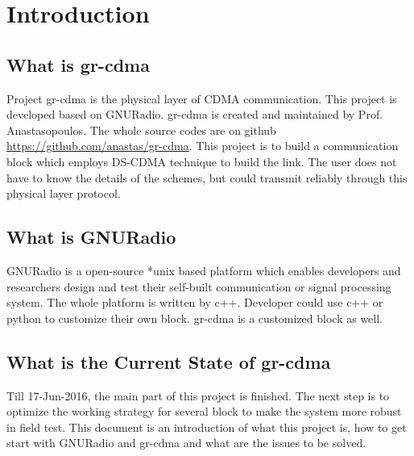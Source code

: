 \chapter{Introduction}
\section{What is gr-cdma}
Project gr-cdma is the physical layer of CDMA communication. This project is developed based on GNURadio\cite{GNURadio}.
gr-cdma is created and maintained by Prof. Anastasopoulos.
The whole source codes are on github \url{https://github.com/anastas/gr-cdma}.
This project is to build a communication block which employs DS-CDMA technique to build the link.
The user does not have to know the details of the schemes, but could transmit reliably through this physical layer protocol.

\section{What is GNURadio}
GNURadio\cite{GNURadio} is a open-source *unix based platform which enables developers and researchers design and test their self-built communication or signal processing system.
The whole platform is written by c++. Developer could use c++ or python to customize their own block. gr-cdma is a customized block as well.

\section{What is the Current State of gr-cdma}
Till 17-Jun-2016, the main part of this project is finished.
The next step is to optimize the working strategy for several block to make the system more robust in field test. 
This document is an introduction of what this project is, how to get start with GNURadio and gr-cdma and what are the issues to be solved. 